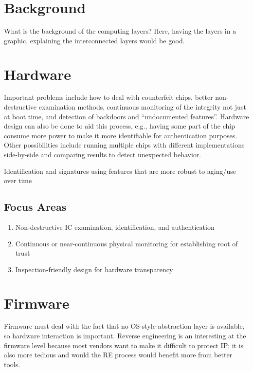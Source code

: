 \documentclass[11pt]{article}
\begin{document}
\section{Background}

What is the background of the computing layers? Here, having the
layers in a graphic, explaining the interconnected layers would be
good.

\section{Hardware}

Important problems include how to deal with counterfeit chips, better
non-destructive examination methods, continuous monitoring of the
integrity not just at boot time, and detection of backdoors and 
``undocumented features''.  Hardware design can also be done to
aid this process, e.g., having some part of the chip consume more power
to make it more identifiable for authentication purposes.  Other
possibilities include running multiple chips with different
implementations side-by-side and comparing results to detect unexpected
behavior.

Identification and signatures using features that are more robust to
aging/use over time

\subsection{Focus Areas}

\begin{enumerate}
	\item Non-destructive IC examination, identification, and
	authentication
	\item Continuous or near-continuous physical monitoring for
	establishing root of trust
	\item Inspection-friendly design for hardware transparency
\end{enumerate}

\section{Firmware}

Firmware must deal with the fact that no OS-style abstraction layer
is available, so hardware interaction is important.  Reverse
engineering is an interesting at the firmware level because most
vendors want to make it difficult to protect IP; it is also more
tedious and would the RE process would benefit more from better tools.
\end{document}
